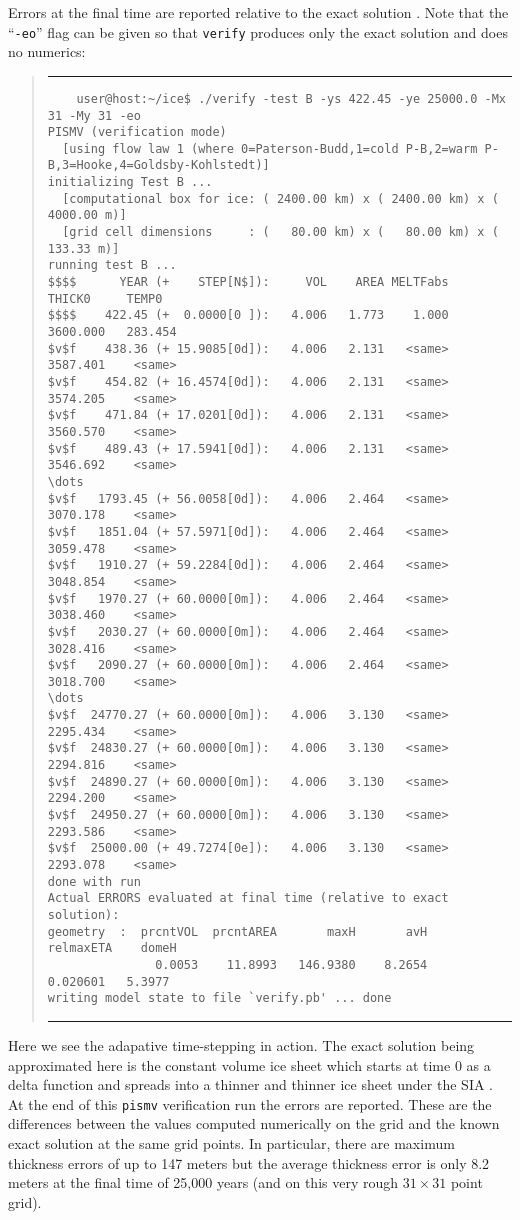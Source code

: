 \documentclass[11pt,final]{amsart}
\renewcommand{\t}[1]{\texttt{#1}}
\newcommand{\Vend}{ \rule{4.6in}{0.1mm}\end{quote}\normalsize }
\newcommand{\beginV}{ \scriptsize\begin{quote}\rule{4.6in}{0.1mm}\begin{verbatim} }
\begin{document}
Errors at the final time are reported relative to the exact solution \cite{BLKCB}.  Note that the ``\t{-eo}'' flag can be given so that \t{verify} produces only the exact solution and does no numerics:
\beginV
    user@host:~/ice$ ./verify -test B -ys 422.45 -ye 25000.0 -Mx 31 -My 31 -eo
PISMV (verification mode)
  [using flow law 1 (where 0=Paterson-Budd,1=cold P-B,2=warm P-B,3=Hooke,4=Goldsby-Kohlstedt)]
initializing Test B ...
  [computational box for ice: ( 2400.00 km) x ( 2400.00 km) x ( 4000.00 m)]
  [grid cell dimensions     : (   80.00 km) x (   80.00 km) x (  133.33 m)]
running test B ...
$$$$      YEAR (+    STEP[N$]):     VOL    AREA MELTFabs     THICK0     TEMP0
$$$$    422.45 (+  0.0000[0 ]):   4.006   1.773    1.000   3600.000   283.454
$v$f    438.36 (+ 15.9085[0d]):   4.006   2.131   <same>   3587.401    <same>
$v$f    454.82 (+ 16.4574[0d]):   4.006   2.131   <same>   3574.205    <same>
$v$f    471.84 (+ 17.0201[0d]):   4.006   2.131   <same>   3560.570    <same>
$v$f    489.43 (+ 17.5941[0d]):   4.006   2.131   <same>   3546.692    <same>
\dots
$v$f   1793.45 (+ 56.0058[0d]):   4.006   2.464   <same>   3070.178    <same>
$v$f   1851.04 (+ 57.5971[0d]):   4.006   2.464   <same>   3059.478    <same>
$v$f   1910.27 (+ 59.2284[0d]):   4.006   2.464   <same>   3048.854    <same>
$v$f   1970.27 (+ 60.0000[0m]):   4.006   2.464   <same>   3038.460    <same>
$v$f   2030.27 (+ 60.0000[0m]):   4.006   2.464   <same>   3028.416    <same>
$v$f   2090.27 (+ 60.0000[0m]):   4.006   2.464   <same>   3018.700    <same>
\dots
$v$f  24770.27 (+ 60.0000[0m]):   4.006   3.130   <same>   2295.434    <same>
$v$f  24830.27 (+ 60.0000[0m]):   4.006   3.130   <same>   2294.816    <same>
$v$f  24890.27 (+ 60.0000[0m]):   4.006   3.130   <same>   2294.200    <same>
$v$f  24950.27 (+ 60.0000[0m]):   4.006   3.130   <same>   2293.586    <same>
$v$f  25000.00 (+ 49.7274[0e]):   4.006   3.130   <same>   2293.078    <same>
done with run
Actual ERRORS evaluated at final time (relative to exact solution):
geometry  :  prcntVOL  prcntAREA       maxH       avH   relmaxETA    domeH
               0.0053    11.8993   146.9380    8.2654    0.020601   5.3977
writing model state to file `verify.pb' ... done
\end{verbatim}
\Vend

Here we see the adapative time-stepping in action.  The exact solution being approximated here is the constant volume ice sheet which starts at time 0 as a delta function and spreads into a thinner and thinner ice sheet under the SIA \cite{BLKCB,Halfar83}.  At the end of this \t{pismv} verification run the errors are reported.  These are the differences between the values computed numerically on the grid and the known exact solution at the same grid points.  In particular, there are maximum thickness errors of up to 147 meters but the average thickness error is only 8.2 meters at the final time of 25,000 years (and on this very rough $31\times 31$ point grid).
\end{document}
